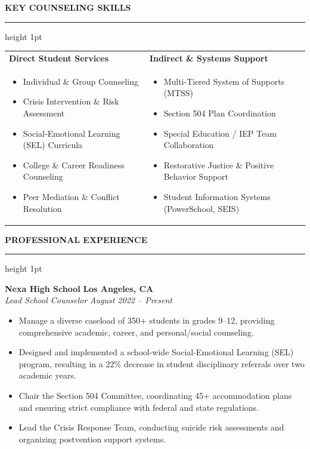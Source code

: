 \documentclass[10pt,letterpaper]{article}
\newcommand{\cvsection}[1]{%
  \vspace{6pt}%
  {\color{primarycolor}\large\bfseries\MakeUppercase{#1}}%
  \vspace{1.5pt}%
  {\color{sectionline}\hrule height 1pt}%
  \vspace{3pt}%
}
\begin{document}
\cvsection{Key Counseling Skills}
\begin{tabularx}{\textwidth}{@{}XX@{}}
    \textbf{Direct Student Services} & \textbf{Indirect \& Systems Support} \\
    \begin{itemize}[leftmargin=1em, nosep, label=\raisebox{0.25ex}{\tiny$\bullet$}]
        \item Individual \& Group Counseling
        \item Crisis Intervention \& Risk Assessment
        \item Social-Emotional Learning (SEL) Curricula
        \item College \& Career Readiness Counseling
        \item Peer Mediation \& Conflict Resolution
    \end{itemize} & 
    \begin{itemize}[leftmargin=1em, nosep, label=\raisebox{0.25ex}{\tiny$\bullet$}]
        \item Multi-Tiered System of Supports (MTSS)
        \item Section 504 Plan Coordination
        \item Special Education / IEP Team Collaboration
        \item Restorative Justice \& Positive Behavior Support
        \item Student Information Systems (PowerSchool, SEIS)
    \end{itemize} \\
\end{tabularx}

\cvsection{Professional Experience}

\textbf{Nexa High School} \hfill \textbf{Los Angeles, CA} \\
\textit{Lead School Counselor} \hfill \textit{August 2022 -- Present}
\begin{itemize}[leftmargin=1.5em, nosep, label=\raisebox{0.25ex}{\tiny$\bullet$}]
    \item Manage a diverse caseload of 350+ students in grades 9--12, providing comprehensive academic, career, and personal/social counseling.
    \item Designed and implemented a school-wide Social-Emotional Learning (SEL) program, resulting in a 22\% decrease in student disciplinary referrals over two academic years.
    \item Chair the Section 504 Committee, coordinating 45+ accommodation plans and ensuring strict compliance with federal and state regulations.
    \item Lead the Crisis Response Team, conducting suicide risk assessments and organizing postvention support systems.
\end{itemize}
\end{document}
